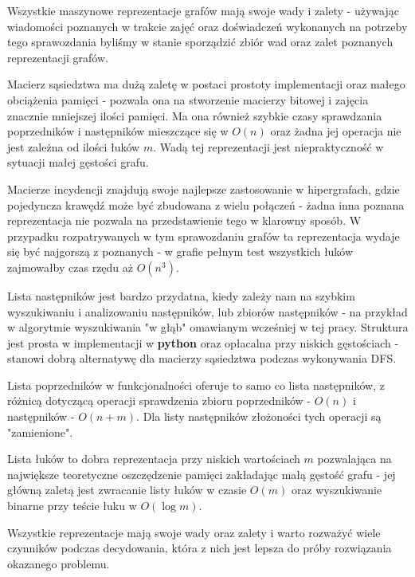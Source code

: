 \documentclass{article}
\begin{document}
Wszystkie maszynowe reprezentacje grafów mają swoje wady i zalety - używając wiadomości poznanych w trakcie zajęć oraz doświadczeń wykonanych na potrzeby tego sprawozdania byliśmy w stanie sporządzić zbiór wad oraz zalet poznanych reprezentacji grafów.

Macierz sąsiedztwa ma dużą zaletę w postaci prostoty implementacji oraz małego obciążenia pamięci - pozwala ona na stworzenie macierzy bitowej i zajęcia znacznie mniejszej ilości pamięci. Ma ona również szybkie czasy sprawdzania poprzedników i następników mieszczące się w $O(n)$ oraz żadna jej operacja nie jest zależna od ilości łuków $m$. Wadą tej reprezentacji jest niepraktyczność w sytuacji małej gęstości grafu.

Macierze incydencji znajdują swoje najlepsze zastosowanie w hipergrafach, gdzie pojedyncza krawędź może być zbudowana z wielu połączeń - żadna inna poznana reprezentacja nie pozwala na przedstawienie tego w klarowny sposób. W przypadku rozpatrywanych w tym sprawozdaniu grafów ta reprezentacja wydaje się być najgorszą z poznanych - w grafie pełnym test wszystkich łuków zajmowałby czas rzędu aż $O(n^3)$.

Lista następników jest bardzo przydatna, kiedy zależy nam na szybkim wyszukiwaniu i analizowaniu następników, lub zbiorów następników - na przykład w algorytmie wyszukiwania "w głąb" omawianym wcześniej w tej pracy. Struktura jest prosta w implementacji w \textbf{python} oraz opłacalna przy niskich gęstościach - stanowi dobrą alternatywę dla macierzy sąsiedztwa podczas wykonywania DFS.

Lista poprzedników w funkcjonalności oferuje to samo co lista następników, z różnicą dotyczącą operacji sprawdzenia zbioru poprzedników - $O(n)$ i następników - $O(n+m)$. Dla listy następników złożoności tych operacji są "zamienione".

Lista łuków to dobra reprezentacja przy niskich wartościach $m$ pozwalająca na największe teoretyczne oszczędzenie pamięci zakładając małą gęstość grafu - jej główną zaletą jest zwracanie listy łuków w czasie $O(m)$ oraz wyszukiwanie binarne przy teście łuku w $O(\log m)$.

Wszystkie reprezentacje mają swoje wady oraz zalety i warto rozważyć wiele czynników podczas decydowania, która z nich jest lepsza do próby rozwiązania okazanego problemu.
\end{document}
